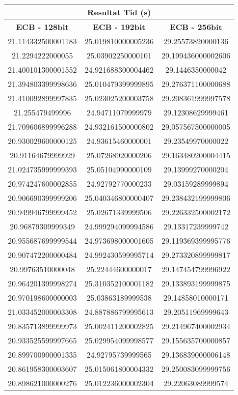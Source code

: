 \begin{table}[H]
    \centering
    \begin{tabular}{ ||c|c|c|| }
      \hline
      \multicolumn{3}{|c|}{\bfseries{Resultat Tid (s)}} \\
      \hline
      \bfseries{ECB - 128bit} & \bfseries{ECB - 192bit} & \bfseries{ECB - 256bit} \\
      \hline
      21.114332500001183 & 25.019810000005236 & 29.25573820000136 \\
      21.2294222000055 & 25.03902250000101 & 29.199436000002606 \\
      21.400101300001552 & 24.921688300004462 & 29.1446350000042 \\
      21.394803399998636 & 25.010479399999895 & 29.276371100000688 \\
      21.410092899997835 & 25.023025200003758 & 29.208361999997578 \\
      21.255479499996 & 24.94711079999979 & 29.12308629999461 \\
      21.709606899996288 & 24.932161500000802 & 29.057567500000005 \\
      20.930029600000125 & 24.93615460000001 & 29.23549970000022 \\
      20.91164679999929 & 25.07268920000206 & 29.163480200004415 \\
      21.024735999999393 & 25.05104990000109 & 29.13999270000204 \\
      20.974247600002855 & 24.92792770000233 & 29.03159289999894 \\
      20.906690399999206 & 25.040346800000407 & 29.238432199999806 \\
      20.949946799999452 & 25.02671339999506 & 29.226332500002172 \\
      20.96879309999349 & 24.999294099994586 & 29.13317239999742 \\
      20.955687699999544 & 24.973698000001605 & 29.119369399995776 \\
      20.907472200000484 & 24.992430599995714 & 29.273320899999817 \\
      20.99763510000048 & 25.22444600000017 & 29.147454799996922 \\
      20.964201399998274 & 25.310352100001182 & 29.133893199999875 \\
      20.970198600000003 & 25.03863189999538 & 29.14858010000171 \\
      21.033452000003308 & 24.887886799995613 & 29.20511969999643 \\
      20.835713899999973 & 25.002411200002825 & 29.214967400002934 \\
      20.933525599997665 & 25.029954099998577 & 29.155635700000857 \\
      20.899700900001335 & 24.92795739999565 & 29.136839000006148 \\
      20.861958300003607 & 25.015061800004332 & 29.250083099999756 \\
      20.898621000000276 & 25.012236000002304 & 29.22063089999574 \\
      \hline
    \end{tabular}
  \end{table}

